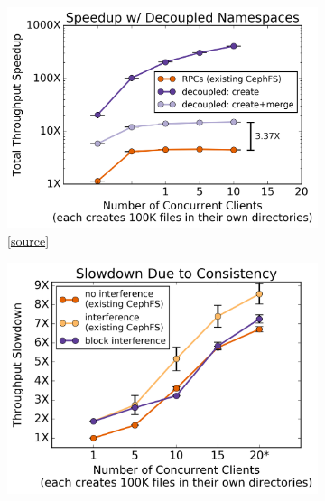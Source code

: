 
\begin{figure}[tb]
  \centering
  \begin{subfigure}[b]{.3\linewidth}
      \centering
      \includegraphics[width=1.0\linewidth]{graphs/mergescale.png}
      \caption{
      [\href{https://github.com/michaelsevilla/cudele-popper/blob/master/experiments/cudele-mergescale/visualize/viz.ipynb}{source}]
      }\label{fig:mergescale}
  \end{subfigure}
  \begin{subfigure}[b]{.3\linewidth}
      \centering
      \includegraphics[width=1.0\linewidth]{graphs/block-allow.png}

\end{subfigure}
\end{figure}
